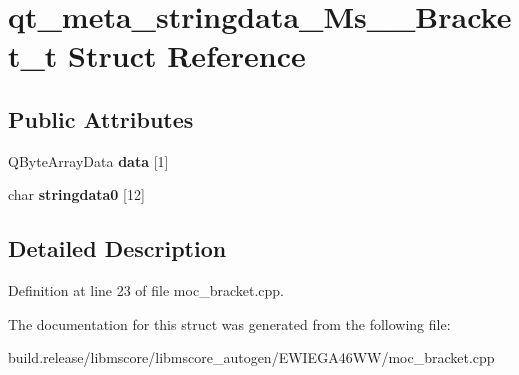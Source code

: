 \hypertarget{structqt__meta__stringdata___ms_____bracket__t}{}\section{qt\+\_\+meta\+\_\+stringdata\+\_\+\+Ms\+\_\+\+\_\+\+Bracket\+\_\+t Struct Reference}
\label{structqt__meta__stringdata___ms_____bracket__t}
\subsection*{Public Attributes}
\begin{DoxyCompactItemize}
\item 
\mbox{\label{structqt__meta__stringdata___ms_____bracket__t_a76e1c03865944a6384bff585d38f6145}} 
Q\+Byte\+Array\+Data {\bfseries data} \mbox{[}1\mbox{]}
\item 
\mbox{\label{structqt__meta__stringdata___ms_____bracket__t_ac4b1c7ab9b87a1f8444e3b4d8134b7fa}} 
char {\bfseries stringdata0} \mbox{[}12\mbox{]}
\end{DoxyCompactItemize}


\subsection{Detailed Description}


Definition at line 23 of file moc\+\_\+bracket.\+cpp.



The documentation for this struct was generated from the following file\+:\begin{DoxyCompactItemize}
\item 
build.\+release/libmscore/libmscore\+\_\+autogen/\+E\+W\+I\+E\+G\+A46\+W\+W/moc\+\_\+bracket.\+cpp\end{DoxyCompactItemize}
